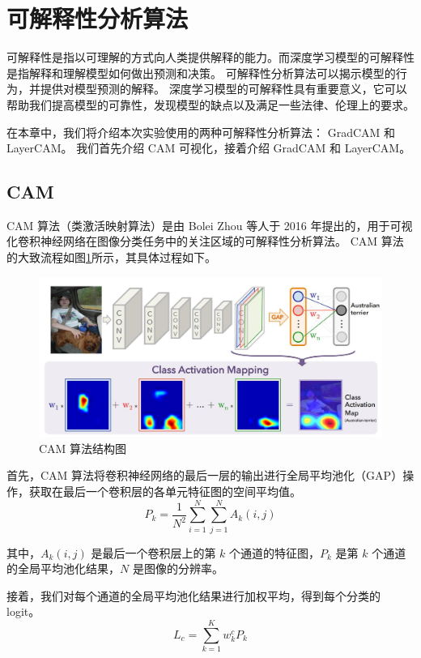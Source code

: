 \documentclass[supercite]{Experimental_Report}
\theoremstyle{definition}
\begin{document}
\section{可解释性分析算法}
可解释性是指以可理解的方式向人类提供解释的能力。而深度学习模型的可解释性是指解释和理解模型如何做出预测和决策。
可解释性分析算法可以揭示模型的行为，并提供对模型预测的解释。
深度学习模型的可解释性具有重要意义，它可以帮助我们提高模型的可靠性，发现模型的缺点以及满足一些法律、伦理上的要求。

在本章中，我们将介绍本次实验使用的两种可解释性分析算法： GradCAM 和 LayerCAM。
我们首先介绍 CAM 可视化，接着介绍 GradCAM 和 LayerCAM。
\subsection{CAM}
CAM 算法（类激活映射算法）是由 Bolei Zhou 等人于 2016 年提出的，用于可视化卷积神经网络在图像分类任务中的关注区域的可解释性分析算法。
CAM 算法的大致流程如图\ref{CAM}所示，其具体过程如下。
\begin{figure}[H]
	\begin{center}
		\includegraphics[scale=0.25]{../images/CAM算法结构图.png}
		\caption{CAM 算法结构图}
		\label{CAM}
	\end{center}
\end{figure}

首先，CAM 算法将卷积神经网络的最后一层的输出进行全局平均池化（GAP）操作，获取在最后一个卷积层的各单元特征图的空间平均值。
\begin{equation}
  P_k=\frac{1}{N^2}\sum_{i=1}^{N}\sum_{j=1}^{N}A_k(i, j)
\end{equation}

其中，$A_k(i, j)$ 是最后一个卷积层上的第 $k$ 个通道的特征图，$P_k$ 是第 $k$ 个通道的全局平均池化结果，$N$ 是图像的分辨率。

接着，我们对每个通道的全局平均池化结果进行加权平均，得到每个分类的 logit。
\begin{equation}
  L_c=\sum_{k=1}^{K}w_k^cP_k
\end{equation}
\end{document}
